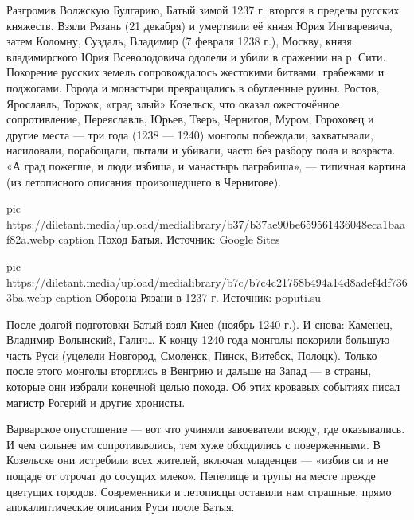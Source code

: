 Разгромив Волжскую Булгарию, Батый зимой 1237 г. вторгся в пределы русских
княжеств. Взяли Рязань (21 декабря) и умертвили её князя Юрия Ингваревича,
затем Коломну, Суздаль, Владимир (7 февраля 1238 г.), Москву, князя
владимирского Юрия Всеволодовича одолели и убили в сражении на р. Сити.
Покорение русских земель сопровождалось жестокими битвами, грабежами и
поджогами. Города и монастыри превращались в обугленные руины. Ростов,
Ярославль, Торжок, «град злый» Козельск, что оказал ожесточённое сопротивление,
Переяславль, Юрьев, Тверь, Чернигов, Муром, Гороховец и другие места — три года
(1238 — 1240) монголы побеждали, захватывали, насиловали, порабощали, пытали и
убивали, часто без разбору пола и возраста. «А град пожегше, и люди избиша, и
манастырь паграбиша», — типичная картина (из летописного описания произошедшего
в Чернигове). 

\ifcmt
  pic https://diletant.media/upload/medialibrary/b37/b37ae90be659561436048eca1baaf82a.webp
  caption Поход Батыя. Источник: Google Sites

	pic https://diletant.media/upload/medialibrary/b7c/b7c4c21758b494a14d8adef4df7363ba.webp
	caption Оборона Рязани в 1237 г. Источник: poputi.su
\fi

После долгой подготовки Батый взял Киев (ноябрь 1240 г.). И снова: Каменец,
Владимир Волынский, Галич… К концу 1240 года монголы покорили большую часть
Руси (уцелели Новгород, Смоленск, Пинск, Витебск, Полоцк). Только после этого
монголы вторглись в Венгрию и дальше на Запад — в страны, которые они избрали
конечной целью похода. Об этих кровавых событиях писал магистр Рогерий и
другие хронисты.

Варварское опустошение — вот что учиняли завоеватели всюду, где оказывались. И
чем сильнее им сопротивлялись, тем хуже обходились с поверженными. В Козельске
они истребили всех жителей, включая младенцев — «избив си и не пощаде от
отрочат до сосущих млеко». Пепелище и трупы на месте прежде цветущих городов.
Современники и летописцы оставили нам страшные, прямо апокалиптические описания
Руси после Батыя. 


